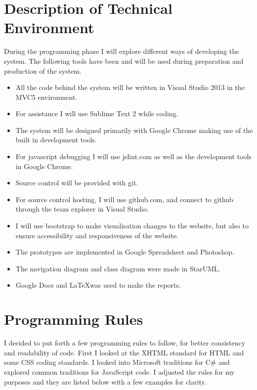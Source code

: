 \documentclass[paper=a4, fontsize=11pt]{scrartcl} %
\numberwithin{equation}{section} %
\numberwithin{figure}{section} %
\numberwithin{table}{section} %
\begin{document}
\section{Description of Technical Environment}
During the programming phase I will explore different ways of developing the system. The following tools have been and will be used during preparation and production of the system.
\begin{itemize}
  \item All the code behind the system will be written in Visual Studio 2013 in the MVC5 environment.
  \item For assistance I will use Sublime Text 2 while coding.
  \item The system will be designed primarily with Google Chrome making use of the built in development tools.
  \item For javascript debugging I will use jslint.com as well as the development tools in Google Chrome.
  \item Source control will be provided with git.
  \item For source control hosting, I will use github.com, and connect to github through the team explorer in Visual Studio.
  \item I will use bootstrap to make visualisation changes to the website, but also to ensure accessibility and responsiveness of the website.
  \item The prototypes are implemented in Google Spreadsheet and Photoshop.
  \item The navigation diagram and class diagram were made in StarUML.
  \item Google Docs and \LaTeX \enspace was used to make the reports.
\end{itemize}

\section{Programming Rules}
I decided to put forth a few programming rules to follow, for better consistency and readability of code. First I looked at the XHTML standard for HTML and some CSS coding standards. I looked into Microsoft traditions for C\# and explored common traditions for JavaScript code. I adjusted the rules for my purposes and they are listed below with a few examples for clarity.
\end{document}

